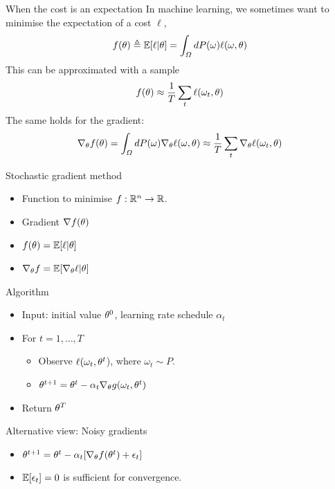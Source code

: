 \documentclass[smaller]{beamer}
\begin{document}
\begin{frame}[label={sec:org2808839}]{When the cost is an expectation}
In machine learning, we sometimes want to minimise the \alert{expectation} of a \alert{cost} \(\ell\), 
\[
f(\theta) \mathrel{\triangleq} \mathop{\mbox{\ensuremath{\mathbb{E}}}}\nolimits[\ell | \theta] = \int_\Omega dP(\omega) \ell(\omega, \theta)
\]
This can be approximated with a sample
\[
f(\theta) \approx \frac{1}{T} \sum_t \ell(\omega_t, \theta)
\]
The same holds for the gradient:
\[
\nabla_\theta f(\theta) = \int_\Omega dP(\omega) \nabla_\theta \ell(\omega, \theta)
\approx \frac{1}{T} \sum_t \nabla_\theta \ell(\omega_t, \theta)
\]
\end{frame}




\begin{frame}[label={sec:orgbb579ab}]{Stochastic gradient method}
\begin{itemize}
\item Function to \alert{minimise} \(f : \mathbb{R}^n \to \mathbb{R}\).
\item \alert{Gradient} \(\nabla f(\theta)\)
\item \(f(\theta) = \mathop{\mbox{\ensuremath{\mathbb{E}}}}\nolimits[\ell | \theta]\)
\item \(\nabla_\theta f = \mathop{\mbox{\ensuremath{\mathbb{E}}}}\nolimits[ \nabla_\theta \ell | \theta]\)
\end{itemize}

\pause
\begin{block}{Algorithm}
\begin{itemize}
\item Input: initial value \(\theta^0\), \alert{learning rate} schedule \(\alpha_t\)
\item For \(t=1, \ldots, T\)
\begin{itemize}
\item Observe \(\ell(\omega_t, \theta^t\)), where \(\omega_t \sim P\).
\item \(\theta^{t+1} = \theta^t - \alpha_t \nabla_\theta g(\omega_t, \theta^t)\)
\end{itemize}
\item Return \(\theta^T\)
\end{itemize}
\end{block}

\begin{block}{Alternative view: Noisy gradients}
\begin{itemize}
\item \(\theta^{t+1} = \theta^t - \alpha_t [\nabla_\theta f(\theta^t) + \epsilon_t]\)
\item \(\mathop{\mbox{\ensuremath{\mathbb{E}}}}\nolimits[\epsilon_t] = 0\) is sufficient for convergence.
\end{itemize}
\pause
\end{block}
\end{frame}
\end{document}
